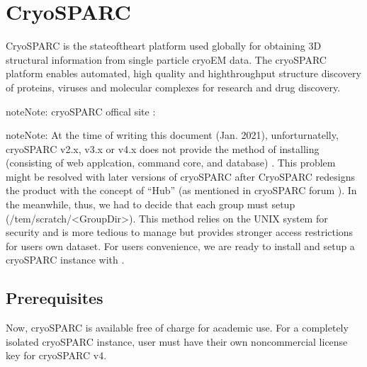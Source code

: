 \documentclass[a4paper,10pt,english]{sphinxmanual}
\begin{document}
\sphinxstepscope


\chapter{CryoSPARC}
\label{\detokenize{cryoSPARC:cryosparc}}\label{\detokenize{cryoSPARC::doc}}
\sphinxAtStartPar
CryoSPARC is the state\sphinxhyphen{}of\sphinxhyphen{}the\sphinxhyphen{}art platform used globally for obtaining 3D structural information from single particle cryo\sphinxhyphen{}EM data.
The cryoSPARC platform enables automated, high quality and high\sphinxhyphen{}throughput structure discovery of proteins, viruses and molecular complexes
for research and drug discovery.

\begin{sphinxadmonition}{note}{Note:}
\sphinxAtStartPar
cryoSPARC offical site : 
\end{sphinxadmonition}

\begin{sphinxadmonition}{note}{Note:}
\sphinxAtStartPar
At the time of writing this document (Jan. 2021), unforturnatelly, cryoSPARC v2.x, v3.x or v4.x does not provide the method of installing 
(consisting of web applcation, command core, and database) .
This problem might be resolved with later versions of cryoSPARC after CryoSPARC re\sphinxhyphen{}designs the product with the concept of “Hub” (as mentioned in cryoSPARC forum
).
In the meanwhile, thus, we had to decide that each group must setup 
(/tem/scratch/<GroupDir>).
This method relies on the UNIX system for security and is more tedious to manage but provides stronger access restrictions for users own dataset.
For users convenience, we are ready to install and setup a cryoSPARC instance with .
\end{sphinxadmonition}


\section{Prerequisites}
\label{\detokenize{cryoSPARC:prerequisites}}
\sphinxAtStartPar
Now, cryoSPARC is available free of charge for academic use. For a completely isolated cryoSPARC instance, user must have their own non\sphinxhyphen{}commercial license key for cryoSPARC v4.
\end{document}
